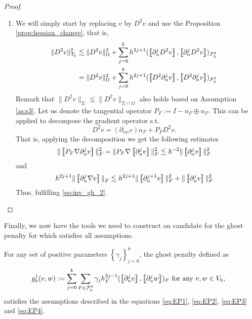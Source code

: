 \begin{proof}
\begin{enumerate}[label=\arabic*)]
    \item We will simply start by replacing $v$  by $D^2 v$ and use the Proposition \ref{prop:hessian_change}, that is,
        \[
            \begin{split}
                    \| D^2 v \|_{ \mathcal{T} _{h} }^{2  }&  \lesssim \| D^2 v \|_{ \Omega  }^{ 2 }  + \sum_{j=0}^{k} h^{2j+1} ( \jump{   \partial ^{j}_{n} D^2 v }, \jump{  \partial ^{j}_{n} D^2 v}    )_{\mathcal{F}_{h}^{g}} \\
                    &=  \| D^2 v \|_{ \Omega  }^{ 2 }  + \sum_{j=0}^{k} h^{2j+1} ( \jump{   D^2 \partial ^{j}_{n}  v }, \jump{  D^2 \partial ^{j}_{n}  v}    )_{\mathcal{F}_{h}^{g}}
            \end{split}
        \]
        Remark that $\|  D^2 v \|_{ T_{l} }^{  } \lesssim  \|  D^2 v \|_{ T_{l} \cap \Omega  }^{  }  $ also holds based on Assumption \ref{as:s3}.
        Let us denote the tangential operator $P_{F} := I - n_{F} \oplus n_{F} $. This can be applied to decompose the gradient operator s.t. \[
        D^2 v = ( \partial _{nn}v)n_{F} + P_{F} D^2 v.
        \]
        That is, applying the decomposition we get the following estimates \[
        \| \jump{ P_{F}   \nabla \partial _{n}^{j} v }\|_{ F }^{ 2 } = \| P_{F} \nabla \jump{ \partial _{n}^{j} v }   \|_{ F  }^{ 2} \lesssim h^{-2} \|  \jump{ \partial ^{j}_{n} v }   \|_{ F }^{  2}
        \]
        and \[
            h^{2j +1} \| \jump{\partial ^{j}_{n} \nabla v}  \|_{ F }^{  } \lesssim h^{2j +1 } \| \jump{ \partial ^{j+1}_{n} v }   \|_{F  }^{ 2 } + \| \jump{ \partial ^{j}_{n}v }   \|_{ F }^{ 2 }
        \]
        Thus, fulfilling \eqref{eq:inv_gh_2}.

    \end{enumerate}


\end{proof}



Finally, we now have the tools we need to construct an candidate for the ghost penalty for which satisfies all assumptions.

\begin{proposition}
    For any set of positive parameters $\left\{ \gamma _{j} \right\} _{j=0}^{k}$, the ghost penalty defined as \[
    g^{1}_{h}( v,w)  := \sum_{j=0}^{k} \sum_{F \in \mathcal{F} _{h}^{g}}^{} \gamma _{j} h^{2j-1}_{F} ( \jump{ \partial ^{j}_{n} v }, \jump{ \partial ^{j}_{n} w }  ) _{F} \text{ for any } v,w \in V_{h},
    \]
    satisfies the assumptions described in the equations \eqref{eq:EP1}, \eqref{eq:EP2}, \eqref{eq:EP3} and \eqref{eq:EP4}.
\end{proposition}


